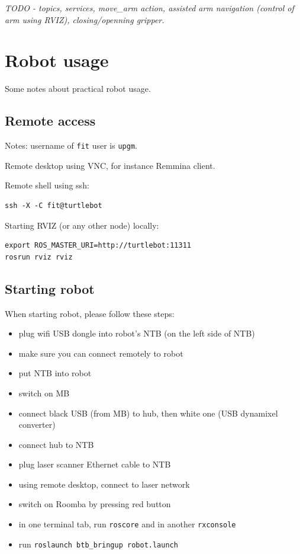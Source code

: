 \documentclass[12pt,a4paper,titlepage]{article}
\numberwithin{equation}{subsection}
\begin{document}
\emph{TODO - topics, services, move\_arm action, assisted arm navigation (control of arm using RVIZ), closing/openning gripper.}

\section{Robot usage}
\label{sec:robot-usage}

Some notes about practical robot usage.

\subsection{Remote access}

Notes: username of \verb|fit| user is \verb|upgm|.

Remote desktop using VNC, for instance Remmina client.

Remote shell using ssh:

\begin{verbatim}
ssh -X -C fit@turtlebot
\end{verbatim}

Starting RVIZ (or any other node) locally:

\begin{verbatim}
export ROS_MASTER_URI=http://turtlebot:11311
rosrun rviz rviz
\end{verbatim}

\subsection{Starting robot}

When starting robot, please follow these steps:

\begin{itemize}
  \item{plug wifi USB dongle into robot's NTB (on the left side of NTB)}
  \item{make sure you can connect remotely to robot}
  \item{put NTB into robot}
  \item{switch on MB}
  \item{connect black USB (from MB) to hub, then white one (USB dynamixel converter)}
  \item{connect hub to NTB}
  \item{plug laser scanner Ethernet cable to NTB}
  \item{using remote desktop, connect to laser network}
  \item{switch on Roomba by pressing red button}
  \item{in one terminal tab, run \verb|roscore| and in another \verb|rxconsole|}
  \item{run \verb|roslaunch btb_bringup robot.launch|}
\end{itemize}
\end{document}
